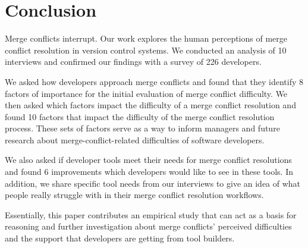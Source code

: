 \section{Conclusion}\label{conclusion}
Merge conflicts interrupt. 
Our work explores the human perceptions of merge conflict resolution in version control systems. We conducted an analysis of 10 interviews and confirmed our findings with a survey of 226 developers.

We asked how developers approach merge conflicts and found that they identify 8 factors of importance for the initial evaluation of merge conflict difficulty. 
We then asked which factors impact the difficulty of a merge conflict resolution and found 10 factors that impact the difficulty of the merge conflict resolution process. 
These sets of factors serve as a way to inform managers and future research about merge-conflict-related difficulties of software developers.

We also asked if developer tools meet their needs for merge conflict resolutions and found 6 improvements which developers would like to see in these tools. In addition, we share specific tool needs from our interviews to give an idea of what people really struggle with in their merge conflict resolution workflows.

Essentially, this paper contributes an empirical study that can act as a basis for reasoning and further investigation about merge conflicts' perceived difficulties and the support that developers are getting from tool builders. 
